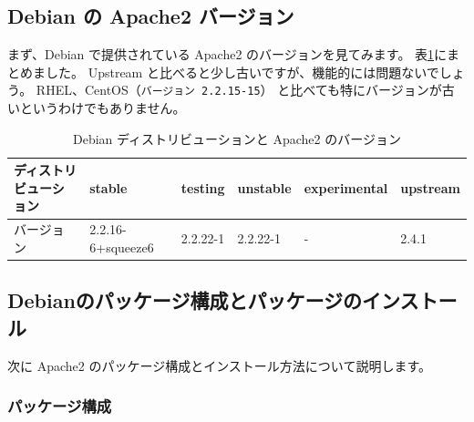 \documentclass[mingoth,a4paper]{jsarticle}
\begin{document}
\subsection{Debian の Apache2 バージョン}

まず、Debian で提供されている Apache2 のバージョンを見てみます。
表\ref{tab:apache-version}にまとめました。
Upstream と比べると少し古いですが、機能的には問題ないでしょう。
RHEL、CentOS（\texttt{バージョン 2.2.15-15}）
と比べても特にバージョンが古いというわけでもありません。

\begin{table}[ht]
\begin{center}
\begin{tabular}{|l|l|l|l|l|l|}
\hline 
ディストリビューション & stable & testing &unstable & experimental & upstream\\
\hline \hline
バージョン & 2.2.16-6+squeeze6 & 2.2.22-1 & 2.2.22-1 & - & 2.4.1 \\
\hline
\end{tabular}
\caption{\label{tab:apache-version}Debian ディストリビューションと Apache2 のバージョン}
\end{center}
\end{table}

\subsection{Debianのパッケージ構成とパッケージのインストール}

次に Apache2 のパッケージ構成とインストール方法について説明します。

\subsubsection{パッケージ構成}
\end{document}
